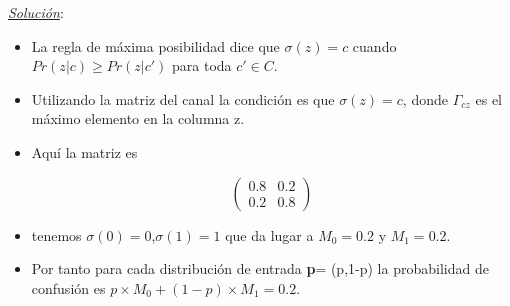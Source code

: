 \documentclass{beamer}
\theoremstyle{plain}
\theoremstyle{example}
\newtheorem{ejercicio} [Ejercicio]{Ejercicio}
\theoremstyle{example}
\begin{document}
 \begin{frame}  \footnotesize 
  \textit{\underline{Solución}}:\\ 

\begin{itemize}
\item  La regla de máxima posibilidad dice que $\sigma(z) =c$ cuando $Pr(z | c) \geq  Pr(z | c')$ para toda  $c' \in C$. 

\item Utilizando la matriz del canal la condición es que $\sigma(z) =c$, donde $\Gamma_{cz}$ es el máximo elemento en la columna z. 
 
\item  Aquí la matriz es
 
 \[
 \left( \begin{array}{cc}
                   
                0.8 & 0.2 \\
                0.2 & 0.8                   
           \end{array}
    \right) 
\]

\item tenemos $\sigma(0)=0$,$\sigma(1)=1$ que da lugar a  $M_0 = 0.2$ y $M_1=0.2$. 

\item Por tanto para cada distribución de entrada \textbf{p}= (p,1-p) la probabilidad de confusión es $p \times M_0 + (1-p) \times M_1 = 0.2$.
 

\end{itemize}
 
 \end{frame} 





\end{document}
